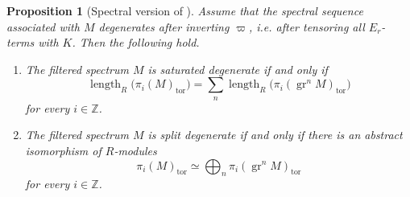 \documentclass[11pt]{amsart}
\newtheorem{proposition}[lemma]{Proposition}
\numberwithin{equation}{section}
\newcommand{\len}{\operatorname{length}}
\newcommand{\tors}{\operatorname{tor}}
\newcommand{\gr}{{\operatorname{gr}}}
\numberwithin{equation}{section}
\begin{document}
\begin{proposition}[{Spectral version of \cite[Proposition 2.5]{L22}}]\label{sscrit}
Assume that the spectral sequence associated with $M$ degenerates after
inverting $\varpi$, i.e. after tensoring all $E_r$-terms with $K$.
Then the following hold.

\begin{enumerate}
\item The filtered spectrum $M$ is saturated degenerate if and only if
\begin{equation*}
  \len_R\bigl(\pi_i(M)_{\tors}\bigr)
  =
  \sum_n
  \len_R\bigl(\pi_i(\gr^nM)_{\tors}\bigr)
\end{equation*}
for every $i\in\mathbb Z$.

\item The filtered spectrum $M$ is split degenerate if and only if there is
an abstract isomorphism of $R$-modules
\begin{equation*}
  \pi_i(M)_{\tors}
  \simeq
  \bigoplus_n \pi_i(\gr^nM)_{\tors}
\end{equation*}
for every $i\in\mathbb Z$.
\end{enumerate}
\end{proposition}
\end{document}
